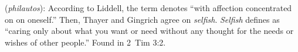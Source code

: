 \item[Selfishness,]

(\textit{philautos}):
According to Liddell, the term denotes ``with affection concentrated on on oneself.'' Then, Thayer and Gingrich agree on \emph{selfish}. \emph{Selfish} defines as ``caring only about what you want or need without any thought for the needs or wishes of other people.''
Found in 2~Tim 3:2.
